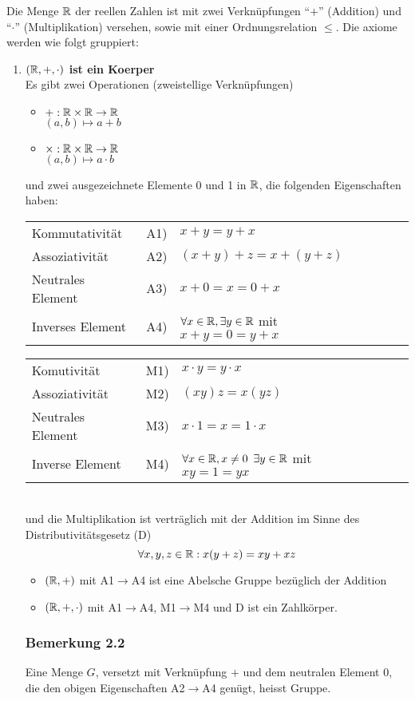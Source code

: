 Die Menge $\mathbb{R}$ der reellen Zahlen ist mit zwei Verknüpfungen ``$+$'' (Addition) und ``$\cdot$'' (Multiplikation) versehen, sowie mit einer Ordnungsrelation $\leq$. Die axiome werden wie folgt gruppiert:
\begin{enumerate}
\item \textbf{$\left( \mathbb{R},+,\cdot\right)$ ist ein Koerper}\\
Es gibt zwei Operationen (zweistellige Verknüpfungen)
\begin{itemize}
\item $+:\mathbb{R}\times\mathbb{R}\to\mathbb{R}$\\
$(a,b)\mapsto a+b$
\item $\times:\mathbb{R}\times\mathbb{R}\to\mathbb{R}$\\
$(a,b)\mapsto a\cdot b$
\end{itemize}
und zwei ausgezeichnete Elemente 0 und 1 in $\mathbb{R}$, die folgenden Eigenschaften haben:\\

\begin{tabular}{l r l r l}
Kommutativität & A1) & $x+y=y+x$  \\
Assoziativität & A2) & $(x+y)+z=x+(y+z)$  \\
Neutrales Element & A3) & $x+0=x=0+x$ \\
Inverses Element & A4) & $\forall x\in\mathbb{R}, \exists y\in\mathbb{R}$ mit $x+y=0=y+x$
\end{tabular}

\begin{tabular}{l r l r l}
Komutivität  & M1) & $x\cdot y=y\cdot x$ \\
Assoziativität  & M2) & $(xy)z=x(yz)$ \\
Neutrales Element  & M3) & $x\cdot 1= x =1\cdot x$\\
Inverse Element  & M4) & $\forall x\in\mathbb{R}, x\not =0$  $ \exists y\in\mathbb{R}$ mit $xy=1=yx$
\end{tabular}
\\

und die Multiplikation ist verträglich mit der Addition im Sinne des Distributivitätsgesetz (D)\[\forall x,y,z\in\mathbb{R}:x(y+z)=xy+xz\]

\begin{itemize}
\item $( \mathbb{R},+)$ mit A1$\to$A4 ist eine Abelsche Gruppe bezüglich der Addition
\item  $( \mathbb{R},+,\cdot)$ mit A1$\to$A4, M1$\to$M4 und D ist ein Zahlkörper.
\end{itemize}

\subsubsection*{Bemerkung 2.2}
Eine Menge $G$, versetzt mit Verknüpfung $+$ und dem neutralen Element $0$, die den obigen Eigenschaften A2$\to$A4 genügt, heisst Gruppe.\\


\end{enumerate}
